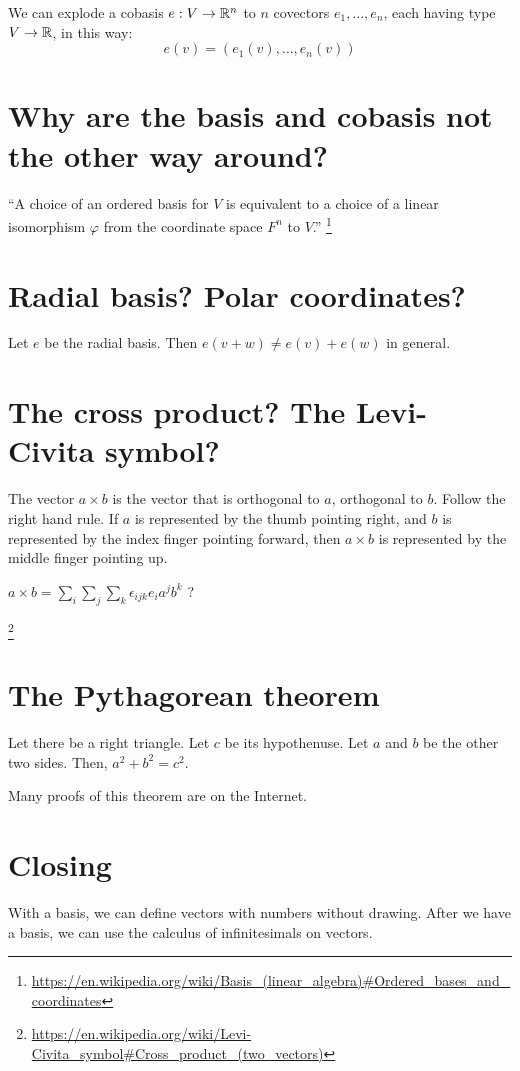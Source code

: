 We can explode a cobasis \( e : V \to \mathbb{R}^n \) to \(n\) covectors \( e_1, \ldots, e_n \),
each having type \( V \to \mathbb{R} \), in this way:
\[
    e(v) = (e_1(v), \ldots, e_n(v))
\]

\section{Why are the basis and cobasis not the other way around?}

\enquote{A choice of an ordered basis for \(V\) is equivalent to a choice of a linear isomorphism \(\varphi\)
from the coordinate space \(F^n\) to \(V\).}%
\footnote{\url{https://en.wikipedia.org/wiki/Basis_(linear_algebra)\#Ordered_bases_and_coordinates}}

\section{Radial basis? Polar coordinates?}

Let \(e\) be the radial basis. Then \(e(v+w) \neq e(v) + e(w)\) in general.

\section{The cross product? The Levi-Civita symbol?}

The vector \( a \times b \) is the vector that is orthogonal to \(a\), orthogonal to \(b\).
Follow the right hand rule.
If \(a\) is represented by the thumb pointing right,
and \(b\) is represented by the index finger pointing forward,
then \(a \times b\) is represented by the middle finger pointing up.

\( a \times b = \sum_i\sum_j\sum_k \epsilon_{ijk} e_i a^j b^k \) ?

\footnote{\url{https://en.wikipedia.org/wiki/Levi-Civita_symbol\#Cross_product_(two_vectors)}}

\section{The Pythagorean theorem}

Let there be a right triangle.
Let \(c\) be its hypothenuse.
Let \(a\) and \(b\) be the other two sides.
Then, \( a^2 + b^2 = c^2 \).

Many proofs of this theorem are on the Internet.

\section{Closing}

With a basis, we can define vectors with numbers without drawing.
After we have a basis, we can use the calculus of infinitesimals on vectors.
